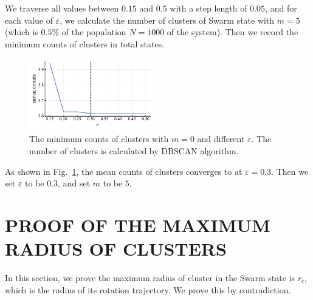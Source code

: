 \documentclass[%
 aip,
 amsmath,amssymb,
 reprint,%
]{revtex4-1}
\begin{document}
We traverse all values between $0.15$ and $0.5$ with a step length of $0.05$, and for each value of $\varepsilon$, we calculate the number of clusters of Swarm state with $m=5$ (which is $0.5\%$ of the population $N=1000$ of the system). Then we record the minimum counts of clusters in total states. 

\begin{figure}
    \includegraphics[width=0.48\textwidth]{./figs/DBSCANparam.pdf}
    \caption{
        \label{fig:DBSCANparam} The minimum counts of clusters with $m=0$ and different $\varepsilon$. The number of clusters is calculated by DBSCAN algorithm. 
    }
\end{figure}
As shown in Fig.~\ref{fig:DBSCANparam}, the mean counts of clusters converges to at $\varepsilon=0.3$. Then we set $\varepsilon$ to be $0.3$, and set $m$ to be $5$.



\section{\label{sec:maxRadius} PROOF OF THE MAXIMUM RADIUS OF CLUSTERS}

In this section, we prove the maximum radius of cluster in the Swarm state is $r_c$, which is the radius of its rotation trajectory. We prove this by contradiction.
\end{document}
